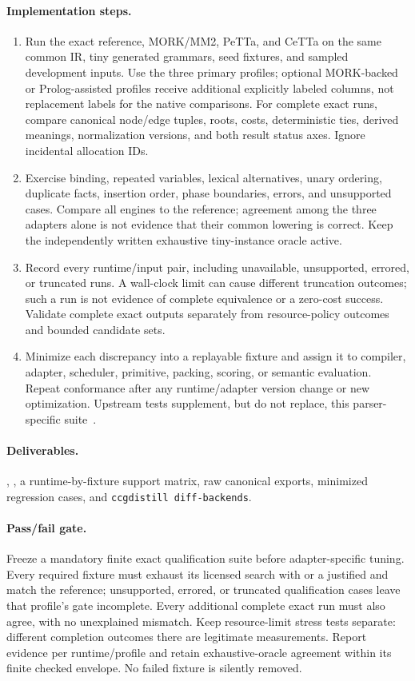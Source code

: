 \documentclass[11pt,a4paper]{article}
\begin{document}
\paragraph{Implementation steps.}
\begin{enumerate}
\item Run the exact reference, MORK/MM2, PeTTa, and CeTTa on the same common
IR, tiny generated grammars, seed fixtures, and sampled development inputs.
Use the three primary profiles; optional MORK-backed or Prolog-assisted
profiles receive additional explicitly labeled columns, not replacement
labels for the native comparisons.
For complete exact runs, compare canonical node/edge tuples, roots, costs,
deterministic ties, derived meanings, normalization versions, and both result
status axes. Ignore incidental allocation IDs.
\item Exercise binding, repeated variables, lexical alternatives, unary
ordering, duplicate facts, insertion order, phase boundaries, errors, and
unsupported cases. Compare all engines to the reference; agreement among the
three adapters alone is not evidence that their common lowering is correct.
Keep the independently written exhaustive tiny-instance oracle active.
\item Record every runtime/input pair, including unavailable, unsupported,
errored, or truncated runs. A wall-clock limit can cause different truncation
outcomes; such a run is not evidence of complete equivalence or a zero-cost
success. Validate complete exact outputs separately from resource-policy
outcomes and bounded candidate sets.
\item Minimize each discrepancy into a replayable fixture and assign it to
compiler, adapter, scheduler, primitive, packing, scoring, or semantic
evaluation. Repeat conformance after any runtime/adapter version change or
new optimization. Upstream tests supplement, but do not replace, this
parser-specific suite~\cite{morkdiff}.
\end{enumerate}

\paragraph{Deliverables.} ,
, a runtime-by-fixture support matrix,
raw canonical exports, minimized regression cases, and
\texttt{ccgdistill diff-backends}.

\paragraph{Pass/fail gate.} Freeze a mandatory finite exact qualification
suite before adapter-specific tuning. Every required fixture must exhaust its
licensed search with  or a justified  and match
the reference; unsupported, errored, or truncated qualification cases leave
that profile's gate incomplete. Every additional complete exact run must also
agree, with no unexplained mismatch. Keep resource-limit stress tests
separate: different completion outcomes there are legitimate measurements.
Report evidence per runtime/profile and retain exhaustive-oracle agreement
within its finite checked envelope. No failed fixture is silently removed.
\end{document}

